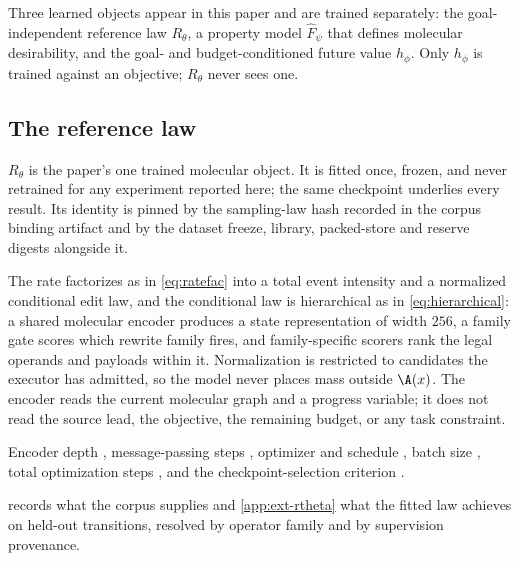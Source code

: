 Three learned objects appear in this paper and are trained separately: the goal-independent reference law $R_\theta$, a property model $\widehat F_\psi$ that defines molecular desirability, and the goal- and budget-conditioned future value $h_\phi$. Only $h_\phi$ is trained against an objective; $R_\theta$ never sees one.

\subsection{The reference law}
\label{app:models-rtheta}

$R_\theta$ is the paper's one trained molecular object. It is fitted once, frozen, and never retrained for any experiment reported here; the same checkpoint underlies every result. Its identity is pinned by the sampling-law hash recorded in the corpus binding artifact and by the dataset freeze, library, packed-store and reserve digests alongside it.

The rate factorizes as in \eqref{eq:ratefac} into a total event intensity and a normalized conditional edit law, and the conditional law is hierarchical as in \eqref{eq:hierarchical}: a shared molecular encoder produces a state representation of width $256$, a family gate scores which rewrite family fires, and family-specific scorers rank the legal operands and payloads within it. Normalization is restricted to candidates the executor has admitted, so the model never places mass outside $\A(x)$. The encoder reads the current molecular graph and a progress variable; it does not read the source lead, the objective, the remaining budget, or any task constraint.

Encoder depth \XXX{}, message-passing steps \XXX{}, optimizer and schedule \XXX{}, batch size \XXX{}, total optimization steps \XXX{}, and the checkpoint-selection criterion \XXX{}.

 records what the corpus supplies and \cref{app:ext-rtheta} what the fitted law achieves on held-out transitions, resolved by operator family and by supervision provenance.

